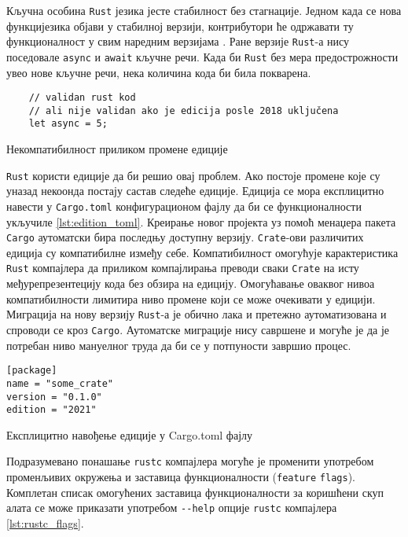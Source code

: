 Кључна особина \verb|Rust| језика јесте стабилност без стагнације. Једном када се нова 
функци језика објави у стабилној верзији, контрибутори ће одржавати 
ту функционалност у свим наредним верзијама \cite{editions}.
Ране верзије \verb|Rust|-а нису поседовале \verb|async| и \verb|await| кључне речи.
Када би \verb|Rust| без мера предострожности увео нове кључне речи, нека количина кода би била покварена.

\begin{listing}[H]
\begin{verbatim}
    // validan rust kod 
    // ali nije validan ako je edicija posle 2018 uključena
    let async = 5; 
\end{verbatim}
\caption{Некомпатибилност приликом промене едиције}
\label{lst:edition}
\end{listing}


\verb|Rust| користи едиције да би решио овај проблем. Ако постоје промене које су уназад 
неко онда постају састав следеће едиције. Едиција се мора експлицитно навести 
у \verb|Cargo.toml| конфигурационом фајлу да би се функционалности укључиле \ref{lst:edition_toml}. Креирање новог пројекта уз 
помоћ менаџера пакета \verb|Cargo| аутоматски бира последњу доступну верзију.
\verb|Crate|-ови различитих едиција су компатибилне између себе. Компатибилност омогућује 
карактеристика \verb|Rust| компајлера да приликом компајлирања преводи сваки \verb|Crate| на исту међурепрезентецију 
кода без обзира на едицију. Омогућавање оваквог нивоа компатибилности лимитира ниво промене 
који се може очекивати у едицији. Миграција на нову верзију \verb|Rust|-а је обично лака и претежно аутоматизована
и спроводи се кроз \verb|Cargo|. Аутоматске миграције нису савршене и могуће је да је потребан ниво мануелног 
труда да би се у потпуности завршио процес.

\begin{listing}[H]
\begin{verbatim}
[package]
name = "some_crate"
version = "0.1.0"
edition = "2021"

\end{verbatim}
\caption{Експлицитно навођење едиције у Cargo.toml фајлу}
\label{lst:edition_toml}
\end{listing}

Подразумевано понашање \verb|rustc| компајлера могуће је променити употребом променљивих окружења 
и заставица функционалности (\verb|feature| \verb|flags|). Комплетан списак омогућених заставица функционалности 
за коришћени скуп алата се може приказати употребом \verb|--help| опције \verb|rustc| компајлера \ref{lst:rustc_flags}.

